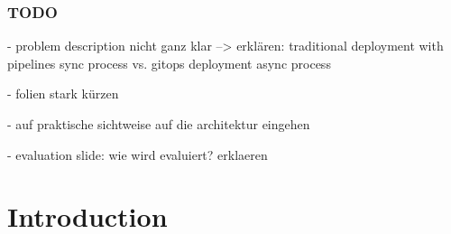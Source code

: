 \documentclass{beamer}
\title{\yourThesisTitle}
\subtitle{\typeOfWork}
\author{\yourNameInclTitle}
\begin{document}

\maketitle






\begin{frame}
\frametitle{TODO}

- problem description nicht ganz klar --> erklären: traditional deployment with pipelines sync process vs. gitops deployment async process

- folien stark kürzen

- auf praktische sichtweise auf die architektur eingehen

- evaluation slide: wie wird evaluiert? erklaeren

\end{frame}





\section{Introduction}
\end{document}
